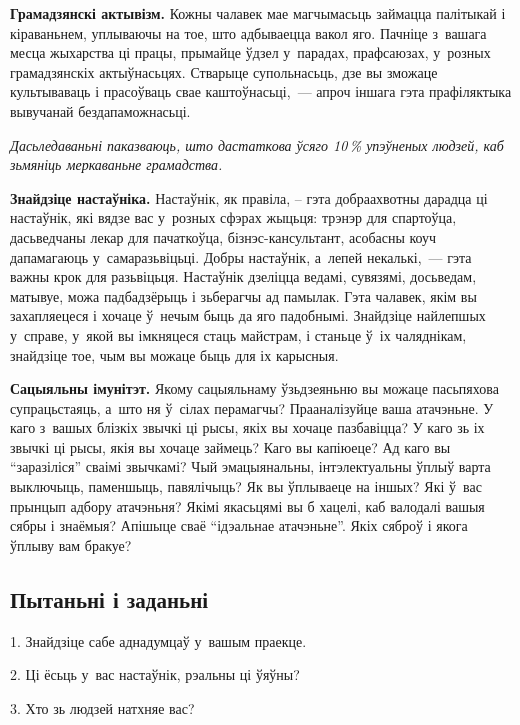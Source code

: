 \textbf{Грамадзянскі актывізм.} Кожны чалавек мае магчымасьць займацца палітыкай і кіраваньнем, уплываючы на тое, што адбываецца вакол яго. Пачніце з~вашага месца жыхарства ці працы, прымайце ўдзел у~парадах, прафсаюзах, у~розных грамадзянскіх актыўнасьцях. Стварыце супольнасьць, дзе вы зможаце культываваць і прасоўваць свае каштоўнасьці,~--- апроч іншага гэта прафіляктыка вывучанай бездапаможнасьці.

\emph{Дасьледаваньні паказваюць, што дастаткова ўсяго 10\,\% упэўненых людзей, каб зьмяніць меркаваньне грамадства.}

\textbf{Знайдзіце настаўніка.} Настаўнік, як правіла, -- гэта добраахвотны дарадца ці настаўнік, які вядзе вас у~розных сфэрах жыцьця: трэнэр для спартоўца, дасьведчаны лекар для пачаткоўца, бізнэс-кансультант, асобасны коуч дапамагаюць у~самаразьвіцьці. Добры настаўнік, а~лепей некалькі,~--- гэта важны крок для разьвіцьця. Настаўнік дзеліцца ведамі, сувязямі, досьведам, матывуе, можа падбадзёрыць і зьберагчы ад памылак. Гэта чалавек, якім вы захапляецеся і хочаце ў~нечым быць да яго падобнымі. Знайдзіце найлепшых у~справе, у~якой вы імкняцеся стаць майстрам, і станьце ў~іх чаляднікам, знайдзіце тое, чым вы можаце быць для іх карысныя.


\textbf{Сацыяльны імунітэт.} Якому сацыяльнаму ўзьдзеяньню вы можаце пасьпяхова супрацьстаяць, а~што ня ў~сілах перамагчы? Прааналізуйце ваша атачэньне. У каго з~вашых блізкіх звычкі ці рысы, якіх вы хочаце пазбавіцца? У каго зь іх звычкі ці рысы, якія вы хочаце займець? Каго вы капіюеце? Ад каго вы ``заразіліся'' сваімі звычкамі? Чый эмацыянальны, інтэлектуальны ўплыў варта выключыць, паменшыць, павялічыць? Як вы ўплываеце на іншых? Які ў~вас прынцып адбору атачэньня? Якімі якасьцямі вы б хацелі, каб валодалі вашыя сябры і знаёмыя? Апішыце сваё ``ідэальнае атачэньне''. Якіх сяброў і якога ўплыву вам бракуе?

\subsection*{Пытаньні і заданьні}

1. Знайдзіце сабе аднадумцаў у~вашым праекце.

2. Ці ёсьць у~вас настаўнік, рэальны ці ўяўны?

3. Хто зь людзей натхняе вас?
